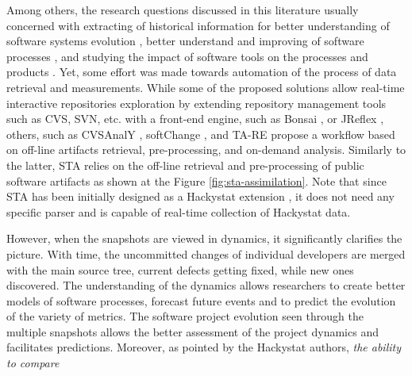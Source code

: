 Among others, the research questions discussed in this literature usually concerned with extracting of 
historical information for better understanding of software systems evolution \cite{citeulike:277045} \cite{citeulike:4000311}, 
better understand and improving of software processes \cite{citeulike:5803126}, 
and studying the impact of software tools on the processes and products \cite{citeulike:13125389}. 
Yet, some effort was made towards automation of the process of data retrieval and measurements. 
While some of the proposed solutions allow real-time interactive repositories exploration by extending 
repository management tools such as CVS, SVN, etc. with a front-end engine, such as Bonsai \cite{bonsai},
or JReflex \cite{citeulike:3017440}, others, such as CVSAnalY \cite{citeulike:6544724}, softChange \cite{citeulike:13125395},
and {TA}-{RE} \cite{citeulike:4000311} propose a workflow based on off-line artifacts retrieval, 
pre-processing, and on-demand analysis.
Similarly to the latter, STA relies on the off-line retrieval and pre-processing of public software artifacts as
shown at the Figure \ref{fig:sta-assimilation}. Note that since STA has been initially designed as a Hackystat 
extension \cite{csdl2-10-09}, it does not need any specific parser and is capable of real-time 
collection of Hackystat data.

However, when the snapshots are viewed in dynamics, it significantly clarifies the picture. 
With time, the uncommitted changes of individual developers are merged with the main source tree, 
current defects getting fixed, while new ones discovered. 
The understanding of the dynamics allows researchers to create better models of software processes, 
forecast future events and to predict the evolution of the variety of metrics.
The software project evolution seen through the multiple snapshots allows the better 
assessment of the project dynamics and facilitates predictions. Moreover, as pointed by the Hackystat authors, 
\cite{citeulike:557296} \textit{the ability to compare}

